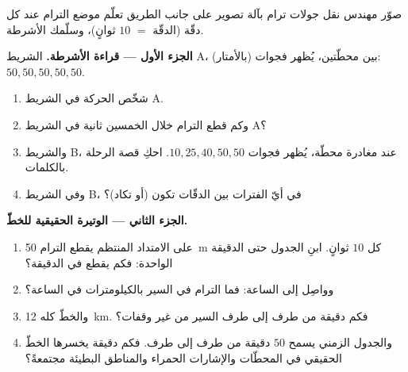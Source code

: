 \begin{problem}\label{pb:g6:describing-motion:1}
صوّر مهندس نقل جولات ترام بآلة تصوير على جانب الطريق تعلّم موضع
الترام عند كل دقّة (الدقّة $=$ $10$ ثوانٍ)، وسلّمك الأشرطة.

\medskip\noindent\textbf{الجزء الأول --- قراءة الأشرطة.}
الشريط A، بين محطّتين، يُظهر فجوات (بالأمتار):
$50, 50, 50, 50, 50$.
\begin{enumerate}
  \item شخّص الحركة في الشريط A.
  \item وكم قطع الترام خلال الخمسين ثانية في الشريط A؟
  \item والشريط B، عند مغادرة محطّة، يُظهر فجوات
        $10, 25, 40, 50, 50$. احكِ قصة الرحلة بالكلمات.
  \item وفي الشريط B، في أيّ الفترات بين الدقّات تكون  (أو تكاد)؟
\end{enumerate}

\medskip\noindent\textbf{الجزء الثاني --- الوتيرة الحقيقية
للخطّ.}
\begin{enumerate}[resume]
  \item على الامتداد المنتظم يقطع الترام \qty{50}{m} كل $10$
        ثوانٍ. ابنِ الجدول حتى الدقيقة الواحدة: فكم يقطع في
        الدقيقة؟
  \item وواصِل إلى الساعة: فما  الترام في السير
        بالكيلومترات في الساعة؟
  \item والخطّ كله \qty{12}{km}. فكم دقيقة من طرف إلى طرف 
        السير من غير وقفات؟
  \item والجدول الزمني يسمح  $50$ دقيقة من طرف إلى طرف. فكم
        دقيقة يخسرها الخطّ الحقيقي في المحطّات والإشارات
        الحمراء والمناطق البطيئة مجتمعةً؟
\end{enumerate}


\end{problem}
